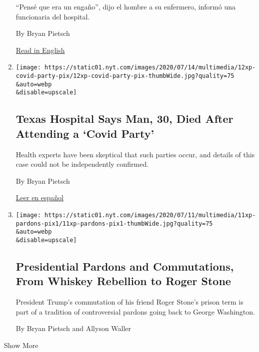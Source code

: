 \begin{enumerate}
  ``Pensé que era un engaño'', dijo el hombre a su enfermero, informó
  una funcionaria del hospital.

  By Bryan Pietsch

  \href{https://www.nytimes.com/2020/07/12/us/30-year-old-covid-party-death.html}{Read
  in English}
\item
  \href{/2020/07/12/us/30-year-old-covid-party-death.html}{}

  \texttt{[image: https://static01.nyt.com/images/2020/07/14/multimedia/12xp-covid-party-pix/12xp-covid-party-pix-thumbWide.jpg?quality=75\\\&auto=webp\\\&disable=upscale]}

  \hypertarget{texas-hospital-says-man-30-died-after-attending-a-covid-party}{%
  \subsection{Texas Hospital Says Man, 30, Died After Attending a `Covid
  Party'}\label{texas-hospital-says-man-30-died-after-attending-a-covid-party}}

  Health experts have been skeptical that such parties occur, and
  details of this case could not be independently confirmed.

  By Bryan Pietsch

  \href{https://www.nytimes.com/es/2020/07/13/espanol/mundo/fiesta-covid.html}{Leer
  en español}
\item
  \href{/2020/07/11/us/presidential-pardons-commutations.html}{}

  \texttt{[image: https://static01.nyt.com/images/2020/07/11/multimedia/11xp-pardons-pix1/11xp-pardons-pix1-thumbWide.jpg?quality=75\\\&auto=webp\\\&disable=upscale]}

  \hypertarget{presidential-pardons-and-commutations-from-whiskey-rebellion-to-roger-stone}{%
  \subsection{Presidential Pardons and Commutations, From Whiskey
  Rebellion to Roger
  Stone}\label{presidential-pardons-and-commutations-from-whiskey-rebellion-to-roger-stone}}

  President Trump's commutation of his friend Roger Stone's prison term
  is part of a tradition of controversial pardons going back to George
  Washington.

  By Bryan Pietsch and Allyson Waller
\end{enumerate}

Show More

